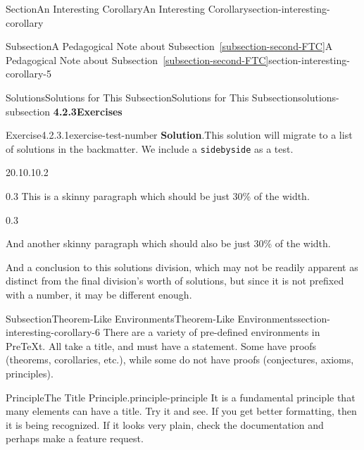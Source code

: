 \documentclass[twoside,10pt,]{article}
\newcommand{\blocktitlefont}{\relax}
\newcommand{\xreffont}{\relax}
\newcommand{\mono}[1]{\texttt{#1}}
\numberwithin{equation}{section}
\begin{document}
\begin{sectionptx}{Section}{An Interesting Corollary}{}{An Interesting Corollary}{}{}{section-interesting-corollary}
\begin{subsectionptx}{Subsection}{A Pedagogical Note about Subsection~{\xreffont\ref*{subsection-second-FTC}}}{}{A Pedagogical Note about Subsection~{\xreffont\ref*{subsection-second-FTC}}}{}{}{section-interesting-corollary-5}
\begin{solutions-subsubsection}{Solutions}{Solutions for This Subsection}{}{Solutions for This Subsection}{}{}{solutions-subsection}
\noindent\textbf{\normalsize{}4.2.3\space\textperiodcentered\space{}Exercises}
\begin{divisionsolution}{Exercise}{4.2.3.1}{}{exercise-test-number}%
\noindent\textbf{\blocktitlefont Solution}.\hypertarget{exercise-test-number-2-main}{}\quad{}This solution will migrate to a list of solutions in the backmatter.  We include a \mono{sidebyside} as a test.%
\begin{sidebyside}{2}{0.1}{0.1}{0.2}%
\begin{sbspanel}{0.3}%
This is a skinny paragraph which should be just 30\% of the width.%
\end{sbspanel}%
\begin{sbspanel}{0.3}%
\par
And another skinny paragraph which should also be just 30\% of the width.%
\end{sbspanel}%
\end{sidebyside}%
\end{divisionsolution}%
\begin{conclusion}{}%
And a conclusion to this solutions division, which may not be readily apparent as distinct from the final division's worth of solutions, but since it is not prefixed with a number, it may be different enough.%
\end{conclusion}%
\end{solutions-subsubsection}
\end{subsectionptx}
%
%
\typeout{************************************************}
\typeout{************************************************}
%
\begin{subsectionptx}{Subsection}{Theorem-Like Environments}{}{Theorem-Like Environments}{}{}{section-interesting-corollary-6}
There are a variety of pre-defined environments in PreTeXt.  All take a title, and must have a statement.  Some have proofs (theorems, corollaries, etc.\@), while some do not have proofs (conjectures, axioms, principles).%
\begin{principle}{Principle}{The Title Principle.}{}{principle-principle}%
It is a fundamental principle that many elements can have a title.  Try it and see. If you get better formatting, then it is being recognized.  If it looks very plain, check the documentation and perhaps make a feature request.%
\end{principle}

\end{subsectionptx}
\end{sectionptx}
\end{document}
